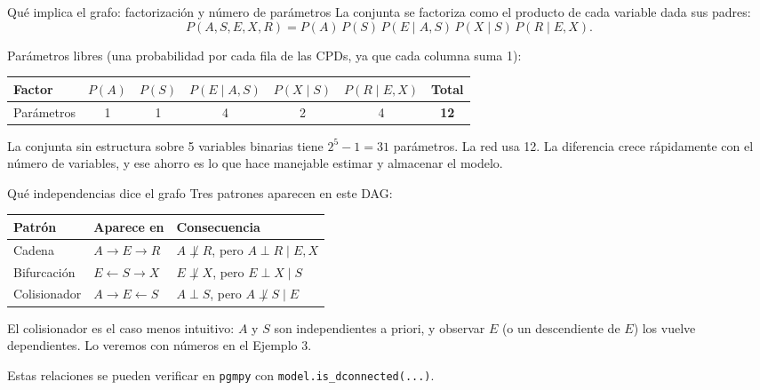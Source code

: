 \documentclass[11pt]{beamer}
\newcommand{\Pp}[1]{P\!\left(#1\right)}
\begin{document}
\begin{frame}{Qué implica el grafo: factorización y número de parámetros}
  La conjunta se factoriza como el producto de cada variable dada sus padres:
  \[
    \Pp{A,S,E,X,R} = \Pp{A}\,\Pp{S}\,\Pp{E\mid A,S}\,\Pp{X\mid S}\,\Pp{R\mid E,X}.
  \]

  \vspace{0.2cm}
  Parámetros libres (una probabilidad por cada fila de las CPDs, ya que cada columna suma 1):

  \vspace{0.1cm}
  \centering
  \small
  \begin{tabular}{lcccccc}
    \toprule
    Factor & $\Pp{A}$ & $\Pp{S}$ & $\Pp{E\mid A,S}$ & $\Pp{X\mid S}$ & $\Pp{R\mid E,X}$ & Total \\
    \midrule
    Parámetros & 1 & 1 & 4 & 2 & 4 & \textbf{12} \\
    \bottomrule
  \end{tabular}

  \vspace{0.3cm}
  \raggedright
  La conjunta sin estructura sobre 5 variables binarias tiene $2^5-1=31$ parámetros. La red usa 12. La diferencia crece rápidamente con el número de variables, y ese ahorro es lo que hace manejable estimar y almacenar el modelo.
\end{frame}

\begin{frame}{Qué independencias dice el grafo}
  Tres patrones aparecen en este DAG:

  \vspace{0.2cm}
  \begin{tabular}{lll}
    \toprule
    Patrón & Aparece en & Consecuencia \\
    \midrule
    Cadena & $A \to E \to R$ & $A \not\perp R$, pero $A \perp R \mid E, X$ \\
    Bifurcación & $E \leftarrow S \rightarrow X$ & $E \not\perp X$, pero $E \perp X \mid S$ \\
    Colisionador & $A \to E \leftarrow S$ & $A \perp S$, pero $A \not\perp S \mid E$ \\
    \bottomrule
  \end{tabular}

  \vspace{0.3cm}
  El colisionador es el caso menos intuitivo: $A$ y $S$ son independientes a priori, y observar $E$ (o un descendiente de $E$) los vuelve dependientes. Lo veremos con números en el Ejemplo 3.

  \vspace{0.2cm}
  \footnotesize Estas relaciones se pueden verificar en \texttt{pgmpy} con \texttt{model.is\_dconnected(...)}.
\end{frame}
\end{document}
